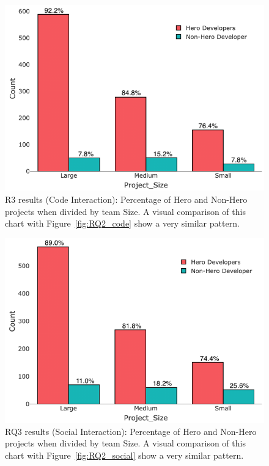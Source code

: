 \documentclass[sigconf,review]{acmart}
\newcommand{\fig}[1]{Figure~\ref{fig:#1}}
\begin{document}
\begin{figure}[!t]
\includegraphics[width=\linewidth]{RQ3_Code.png}
\caption{R3 results (Code Interaction): Percentage of Hero and Non-Hero projects when divided by team Size.
 A visual comparison of this
chart with \fig{RQ2_code} show a very similar pattern.
}
\label{fig:RQ3_code}
\end{figure}
   
  
\begin{figure}[!t]
\includegraphics[width=\linewidth]{RQ3_Social.png}
\caption{RQ3 results (Social Interaction): Percentage of Hero and Non-Hero projects when divided by team Size. A visual comparison of this
chart with \fig{RQ2_social} show a very similar pattern.}
\label{fig:RQ3_social}
\end{figure}
\end{document}
